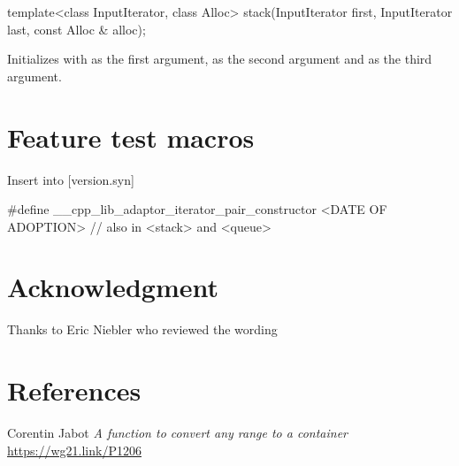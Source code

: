 \documentclass{wg21}
\begin{document}
\begin{addedblock}

\begin{itemdecl}
    template<class InputIterator, class Alloc>
    stack(InputIterator first, InputIterator last, const Alloc & alloc);
\end{itemdecl}

\begin{itemdescr}
\pnum
\effects
Initializes  with  as the first argument,  as the second argument and  as the third argument.
\end{itemdescr}

\end{addedblock}


\section{Feature test macros}

Insert into [version.syn]

\begin{addedblock}
\begin{codeblock}
#define __cpp_lib_adaptor_iterator_pair_constructor <DATE OF ADOPTION> // also in <stack> and <queue>
\end{codeblock}
\end{addedblock}

\section{Acknowledgment}

Thanks to Eric Niebler who reviewed the wording

\section{References}
\renewcommand{\section}[2]{}%
\begin{thebibliography}{9}
	
	Corentin Jabot
	\emph{A function to convert any range to a container}\newline
	\url{https://wg21.link/P1206}

\end{thebibliography}
\end{document}
